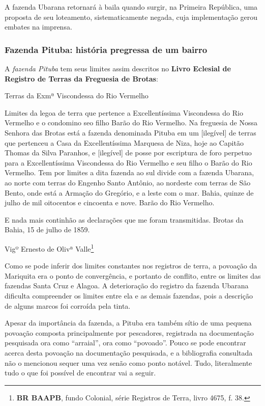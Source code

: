 A fazenda Ubarana retornará à baila quando surgir, na Primeira República, uma proposta de seu loteamento, sistematicamente negada, cuja implementação gerou embates na imprensa.

\subsubsection{Fazenda Pituba: história pregressa de um bairro}

A \textit{fazenda Pituba} tem seus limites assim descritos no \textbf{Livro Eclesial de Registro de Terras da Freguesia de Brotas}:

\begin{citacao}
Terras da Exmª Viscondessa do Rio Vermelho

Limites da legoa de terra que pertence a Excellentíssima Viscondessa do Rio Vermelho e o condomino seo filho Barão do Rio Vermelho. Na freguesia de Nossa Senhora das Brotas está a fazenda denominada Pituba em um [ilegível] de terras que pertenceu a Casa da Excellentíssima Marquesa de Niza, hoje ao Capitão Thomas da Silva Paranhos, e [ilegível] de posse por escriptura de foro perpetuo para a Excellentíssima Viscondessa do Rio Vermelho e seu filho o Barão do Rio Vermelho. Tem por limites a dita fazenda ao sul divide com a fazenda Ubarana, ao norte com terras do Engenho Santo Antônio, ao nordeste com terras de São Bento, onde está a Armação do Gregório, e a leste com o mar. Bahia, quinze de julho de mil oitocentos e cincoenta e nove. Barão do Rio Vermelho.

E nada mais continhão as declarações que me foram transmitidas. Brotas da Bahia, 15 de julho de 1859.

Vigº Ernesto de Olivª Valle\footnote{\textbf{BR BAAPB}, fundo Colonial, série Registros de Terra, livro 4675, f. 38.}
\end{citacao}

Como se pode inferir dos limites constantes nos registros de terra, a povoação da Mariquita era o ponto de convergência, e portanto de conflito, entre os limites das fazendas Santa Cruz e Alagoa. A deterioração do registro da fazenda Ubarana dificulta compreender os limites entre ela e as demais fazendas, pois a descrição de alguns marcos foi corroída pela tinta.

Apesar da importância da fazenda, a Pituba era também sítio de uma pequena povoação composta principalmente por pescadores, registrada na documentação pesquisada ora como ``arraial'', ora como ``povoado''. Pouco se pode encontrar acerca desta povoação na documentação pesquisada, e a bibliografia consultada não o mencionou sequer uma vez senão como ponto notável. Tudo, literalmente tudo o que foi possível de encontrar vai a seguir.

